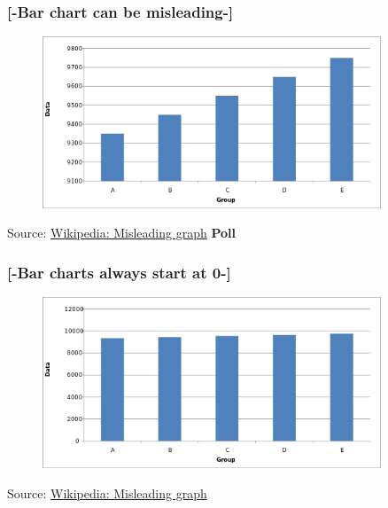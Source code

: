 \documentclass[xcolor=x11names,compress, aspectratio=169]{beamer}
\renewcommand{\(}{\begin{columns}}
\renewcommand{\)}{\end{columns}}
\newcommand{\<}[1]{\begin{column}{#1}}
\renewcommand{\>}{\end{column}}
\begin{document}
\begin{frame} %
\frametitle{\textcolor{brique}{[-\textbf{Bar chart can be misleading}-]}}
\begin{figure}
\includegraphics[width = 0.9\textwidth]{Truncated_Bar_Graph.png}
\end{figure}
\textcolor{gris}{\footnotesize{Source: \href{https://en.wikipedia.org/wiki/Misleading_graph}{Wikipedia: Misleading graph}}}  \hfill \textcolor{brique}{\textbf{Poll}}
\end{frame}

\begin{frame} %
\frametitle{\textcolor{brique}{[-\textbf{Bar charts always start at 0}-]}}
\begin{figure}[h]
\includegraphics[width = 0.9\textwidth]{Bar_graph.png}
\end{figure}
\textcolor{gris}{\footnotesize{Source: \href{https://en.wikipedia.org/wiki/Misleading_graph}{Wikipedia: Misleading graph}}}
\end{frame}
\end{document}
